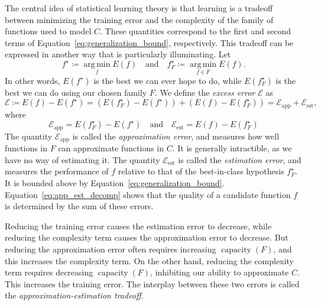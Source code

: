 \documentclass[11pt,a4paper]{article}
\numberwithin{equation}{section}
\newcommand{\capacity}{\operatorname{capacity}}
\newcommand{\apperr}{\mathcal{E}_{\mathrm{app}}}
\newcommand{\esterr}{\mathcal{E}_{\mathrm{est}}}
\newcommand{\argmin}{\operatorname*{arg\,min}}
\begin{document}
The central idea of statistical learning theory is that learning is a tradeoff
between minimizing the training error and the complexity of the family of
functions used to model $C$. These quantities correspond to the first and second
terms of Equation~\ref{eq:generalization_bound}, respectively. This tradeoff can
be expressed in another way that is particularly illuminating. Let
\[
	f^\star \coloneqq \argmin_{f} E(f) \quad\text{and}\quad
	f_F^\star \coloneqq \argmin_{f \in F} E(f).
\]
In other words, $E(f^\star)$ is the best we can ever hope to do, while
$E(f_F^\star)$ is the best we can do using our chosen family $F$. We define the
\emph{excess error} $\mathcal{E}$ as
\begin{equation}
	\mathcal{E} \coloneqq E(f) - E(f^\star)
		= (E(f_F^\star) - E(f^\star)) + (E(f) - E(f_F^\star))
		= \apperr + \esterr,
	\label{eq:app_est_decomp}
\end{equation}
where
\[
	\apperr = E(f_F^\star) - E(f^\star)
	\quad\text{and}\quad
	\esterr = E(f) - E(f_F^\star)
\]
The quantity $\apperr$ is called the \emph{approximation error}, and measures
how well functions in $F$ can approximate functions in $C$. It is generally
intractible, as we have no way of estimating it. The quantity $\esterr$ is
called the \emph{estimation error}, and measures the performance of $f$ relative
to that of the best-in-class hypothesis $f_F^\star$. It is bounded above by
Equation~\ref{eq:generalization_bound}. Equation~\ref{eq:app_est_decomp} shows
that the quality of a candidate function $f$ is determined by the sum of these
errors.

Reducing the training error causes the estimation error to decrease, while
reducing the complexity term causes the approximation error to decrease. But
reducing the approximation error often requires increasing $\capacity(F)$, and
this increases the complexity term. On the other hand, reducing the complexity
term requires decreasing $\capacity(F)$, inhibiting our ability to approximate
$C$. This increases the training error. The interplay between these two errors
is called the \emph{approximation-estimation tradeoff}.
\end{document}
